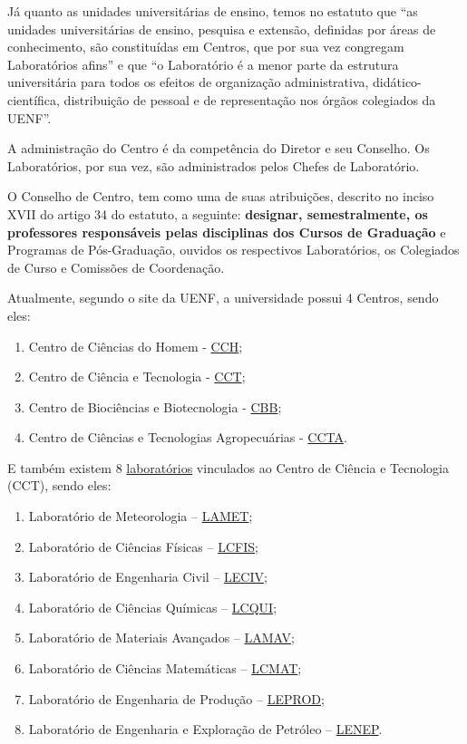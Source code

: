 Já quanto as unidades universitárias de ensino, temos no estatuto que ``as unidades universitárias de ensino, pesquisa e extensão, definidas por áreas de conhecimento, são constituídas em Centros, que por sua vez congregam Laboratórios afins'' e que ``o Laboratório é a menor parte da estrutura universitária para todos os efeitos de organização administrativa, didático-científica, distribuição de pessoal e de representação nos órgãos colegiados da UENF''.

A administração do Centro é da competência do Diretor e seu Conselho. Os Laboratórios, por sua vez, são administrados pelos Chefes de Laboratório.

O Conselho de Centro, tem como uma de suas atribuições, descrito no inciso XVII do artigo 34 do estatuto, a seguinte: \textbf{designar, semestralmente, os professores responsáveis pelas disciplinas dos Cursos de Graduação} e Programas de Pós-Graduação, ouvidos os respectivos Laboratórios, os Colegiados de Curso e Comissões de Coordenação.

Atualmente, segundo o site da UENF, a universidade possui 4 Centros, sendo eles:

\begin{enumerate}
  \item Centro de Ciências do Homem - \href{https://uenf.br/cch/}{CCH};
  \item Centro de Ciência e Tecnologia - \href{https://uenf.br/cct/}{CCT};
  \item Centro de Biociências e Biotecnologia - \href{https://uenf.br/cbb/}{CBB};
  \item Centro de Ciências e Tecnologias Agropecuárias - \href{https://uenf.br/ccta/}{CCTA}.
\end{enumerate}

E também existem 8 \href{https://uenf.br/cct/administracao/laboratorios/}{laboratórios} vinculados ao Centro de Ciência e Tecnologia (CCT), sendo eles:

\begin{enumerate}
  \item Laboratório de Meteorologia – \href{https://uenf.br/cct/lamet/}{LAMET};
  \item Laboratório de Ciências Físicas – \href{https://uenf.br/cct/lcfis/}{LCFIS};
  \item Laboratório de Engenharia Civil – \href{https://uenf.br/cct/leciv/}{LECIV};
  \item Laboratório de Ciências Químicas – \href{https://uenf.br/cct/lcqui/}{LCQUI};
  \item Laboratório de Materiais Avançados – \href{https://uenf.br/cct/lamav/}{LAMAV};
  \item Laboratório de Ciências Matemáticas – \href{https://uenf.br/cct/lcmat/}{LCMAT};
  \item Laboratório de Engenharia de Produção – \href{https://uenf.br/cct/leprod/}{LEPROD};
  \item Laboratório de Engenharia e Exploração de Petróleo – \href{https://uenf.br/cct/lenep/}{LENEP}.
\end{enumerate}


